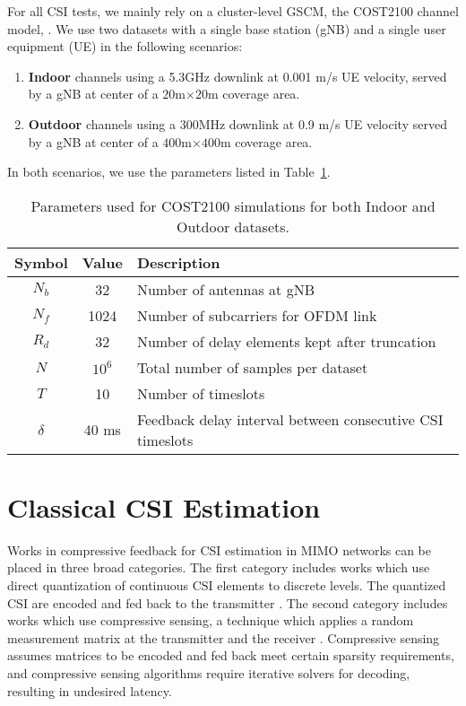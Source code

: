 For all CSI tests, we mainly rely on a cluster-level GSCM, the COST2100 channel model,  \cite{ref:liu2012cost2100}. We use two datasets with a single base station (gNB) and a single user equipment (UE) in the following scenarios:
\begin{enumerate}
	\item \textbf{Indoor} channels using a 5.3GHz downlink at
	0.001 m/s UE velocity, served by a
	gNB at center of a $20$m$\times 20$m coverage area.
	\item \textbf{Outdoor} channels using a 300MHz downlink at 0.9 m/s UE velocity served by a gNB at center 
	of a $400$m$\times 400$m coverage area.
\end{enumerate}
In both scenarios, we use the parameters listed in Table~\ref{tab:cost-params}.
\begin{table}[]
\centering
\caption{Parameters used for COST2100 simulations for both Indoor and Outdoor datasets.}
\label{tab:cost-params}
\begin{tabular}{c|c|l}
\toprule
\textbf{Symbol} & \textbf{Value} & \textbf{Description} \\ \midrule
$N_b$ 			& 32			 & Number of antennas at gNB  \\ \hline
$N_f$ 			& 1024			 & Number of subcarriers for OFDM link  \\ \hline
$R_d$ 			& 32			 & Number of delay elements kept after truncation  \\ \hline
$N$ 			& $10^6$		 & Total number of samples per dataset  \\ \hline
$T$ 			& 10		 	 & Number of timeslots  \\ \hline
$\delta$		& 40 ms			 & Feedback delay interval between consecutive CSI timeslots  \\ \bottomrule
\end{tabular}
\end{table}

\section{Classical CSI Estimation}
\label{sect:classic_estimation}

Works in compressive feedback for CSI estimation in MIMO networks can be placed in three broad categories. The first category includes works which use direct quantization of continuous CSI elements to discrete levels. The quantized CSI are encoded and fed back to the transmitter \cite{ref:makki2012hybrid,ref:shirani2009channel}. The second category includes works which use compressive sensing, a technique which applies a random measurement matrix at the transmitter and the receiver \cite{ref:rao2014distributed, ref:eltayeb2014compressive}. Compressive sensing assumes matrices to be encoded and fed back meet certain sparsity requirements, and compressive sensing algorithms require iterative solvers \cite{ref:do2008sparsity} for decoding, resulting in undesired latency.

